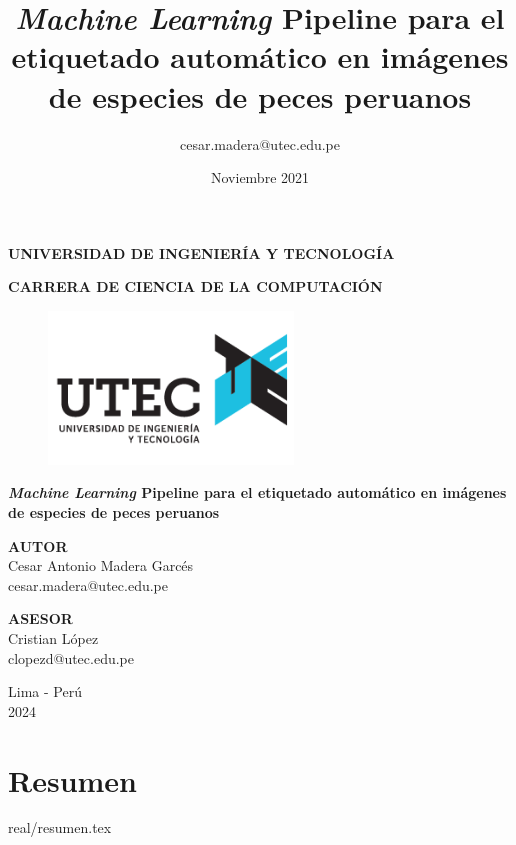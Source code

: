 \documentclass{report}
\title{\textit{Machine Learning} Pipeline para el etiquetado 
automático en imágenes de especies 
de peces peruanos}
\author{cesar.madera@utec.edu.pe}
\date{Noviembre 2021}
\begin{document}
\begin{titlepage}
    \begin{center}
        \Large
        \textbf{UNIVERSIDAD DE INGENIERÍA Y TECNOLOGÍA}
        \vspace*{1cm}

        \large
        \textbf{CARRERA DE CIENCIA DE LA COMPUTACIÓN}
        \vspace*{1cm}

        \begin{figure}[htbp]
            \centering
            \includegraphics[width=6.5cm,height=\textheight,keepaspectratio]{images/logo}
        \end{figure}


        \LARGE
        \textbf{\textit{Machine Learning} Pipeline para el etiquetado 
        automático en imágenes de especies 
        de peces peruanos}

        \vspace{1.0cm}
        \Large


        \textbf{AUTOR}
        \vspace{0.5cm}
        \\Cesar Antonio Madera Garcés
        \\cesar.madera@utec.edu.pe

        \textbf{ASESOR}
        \vspace{0.5cm}
        \\Cristian López
        \\clopezd@utec.edu.pe
        \vfill
        \Large

        Lima - Perú
        \\
        2024

    \end{center}
\end{titlepage}


\chapter*{Resumen}
{real/resumen.tex}
\end{document}

